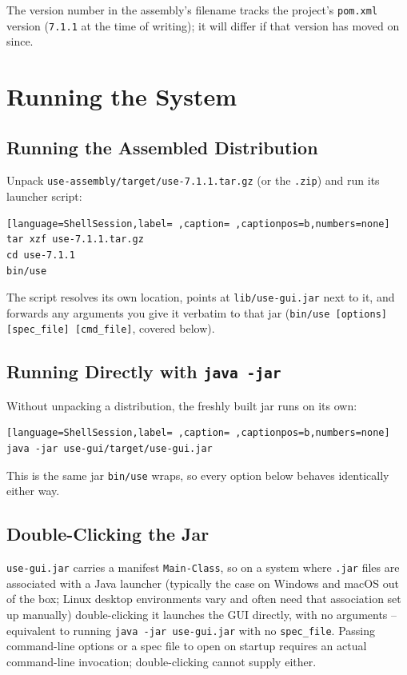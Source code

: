 \documentclass[11pt,twoside,a4paper]{book}
\begin{document}
The version number in the assembly's filename tracks the project's
\texttt{pom.xml} version (\texttt{7.1.1} at the time of writing); it will differ if
that version has moved on since.
\chapter{Running the System}
\label{sec:orgfe2e8a9}
\section{Running the Assembled Distribution}
\label{sec:org6b0e5f2}
Unpack \texttt{use-assembly/target/use-7.1.1.tar.gz} (or the \texttt{.zip}) and run
its launcher script:

\begin{lstlisting}[language=ShellSession,label= ,caption= ,captionpos=b,numbers=none]
tar xzf use-7.1.1.tar.gz
cd use-7.1.1
bin/use
\end{lstlisting}

The script resolves its own location, points at
\texttt{lib/use-gui.jar} next to it, and forwards any arguments you give it
verbatim to that jar (\texttt{bin/use [options] [spec\_file] [cmd\_file]},
covered below).

\section{Running Directly with \texttt{java -jar}}
\label{sec:org45ede65}
Without unpacking a distribution, the freshly built jar runs on its
own:

\begin{lstlisting}[language=ShellSession,label= ,caption= ,captionpos=b,numbers=none]
java -jar use-gui/target/use-gui.jar
\end{lstlisting}

This is the same jar \texttt{bin/use} wraps, so every option below behaves
identically either way.

\section{Double-Clicking the Jar}
\label{sec:orgd2d97d8}
\texttt{use-gui.jar} carries a manifest \texttt{Main-Class}, so on a system where
\texttt{.jar} files are associated with a Java launcher (typically the case
on Windows and macOS out of the box; Linux desktop environments vary
and often need that association set up manually) double-clicking it
launches the GUI directly, with no arguments -- equivalent to running
\texttt{java -jar use-gui.jar} with no \texttt{spec\_file}. Passing command-line
options or a spec file to open on startup requires an actual
command-line invocation; double-clicking cannot supply either.
\end{document}
